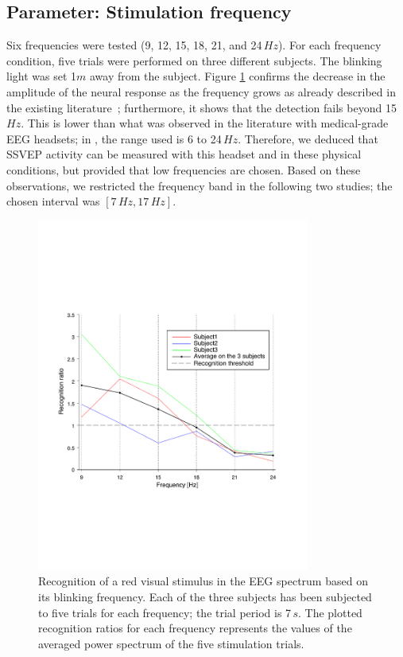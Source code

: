 \documentclass[smallextended]{svjour3}
\begin{document}
\subsection{Parameter: Stimulation frequency}
Six frequencies were tested (9, 12, 15, 18, 21, and 24\,$Hz$). For each frequency condition, five trials were performed on three different subjects. The blinking light was set 1$m$ away from the subject. 
Figure \ref{fig:graph-frequences} confirms the decrease in the amplitude of the neural response as the frequency grows as already described in the existing literature~\cite{herrmann2001}; furthermore, it shows that the detection fails beyond 15\,$Hz$. 
This is lower than what was observed in the literature with medical-grade EEG headsets; in \cite{SSVEPfiability}, the range used is 6 to 24\,$Hz$. Therefore, we deduced that SSVEP activity can be measured with this headset and in these physical conditions, but provided that low frequencies are chosen.
Based on these observations, we restricted the frequency band in the following two studies; the chosen interval was $[7\,Hz, 17\,Hz]$.

\begin{figure}
\center
\includegraphics[width=0.8\textwidth]{figures/graph-frequences.pdf}
\caption{Recognition of a red visual stimulus in the EEG spectrum based on its blinking frequency. Each of the three subjects has been subjected to five trials for each frequency; the trial period is 7\,$s$. The plotted recognition ratios for each frequency represents the values of the averaged power spectrum of the five stimulation trials.} \label{fig:graph-frequences}
\end{figure}
\end{document}
